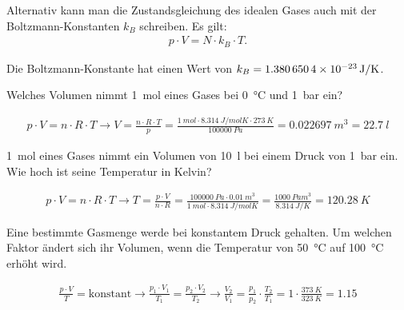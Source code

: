 Alternativ kann man die Zustandsgleichung des idealen Gases auch mit der Boltzmann-Konstanten $k_B$ schreiben.
Es gilt:
\begin{eqnarray*}
	p\cdot V = N\cdot k_B\cdot T\text{.}
\end{eqnarray*}

Die Boltzmann-Konstante hat einen Wert von $k_B=\SI{1.3806504E-23}{J/K}$.

\begin{aufgabe}
	Welches Volumen nimmt \SI{1}{mol} eines Gases bei \SI{0}{\celsius} und \SI{1}{bar} ein?
	\begin{loesung}
		\begin{eqnarray*}
			p\cdot V=n\cdot R\cdot T \to V=\frac{n\cdot R\cdot T}{p}=\frac{\SI{1}{mol}\cdot\SI{8.314}{J/mol K}\cdot\SI{273}{K}}{\SI{100000}{Pa}}=\SI{0.022697}{m^3}=\SI{22.7}{l}
		\end{eqnarray*}
	\end{loesung}
\end{aufgabe}

\begin{aufgabe}
	\SI{1}{mol} eines Gases nimmt ein Volumen von \SI{10}{l} bei einem Druck von \SI{1}{bar} ein.
	Wie hoch ist seine Temperatur in Kelvin?
	\begin{loesung}
		\begin{eqnarray*}
			p\cdot V=n\cdot R\cdot T \to T=\frac{p\cdot V}{n\cdot R}=\frac{\SI{100000}{Pa}\cdot\SI{0.01}{m^3}}{\SI{1}{mol}\cdot\SI{8.314}{J/mol K}}=\frac{\SI{1000}{Pa m^3}}{\SI{8.314}{J/ K}}=\SI{120.28}{K}
		\end{eqnarray*}
	\end{loesung}
\end{aufgabe}

\begin{aufgabe}
	Eine bestimmte Gasmenge werde bei konstantem Druck gehalten. Um welchen Faktor ändert sich
	ihr Volumen, wenn die Temperatur von \SI{50}{\celsius} auf \SI{100}{\celsius} erhöht wird.
	\begin{loesung}
		\begin{eqnarray*}
			\frac{p\cdot V}{T}=\text{konstant}\to\frac{p_1\cdot V_1}{T_1}=\frac{p_2\cdot V_2}{T_2}\to\frac{V_2}{V_1}=\frac{p_1}{p_2}\cdot\frac{T_2}{T_1}=1\cdot\frac{\SI{373}{K}}{\SI{323}{K}}=\num{1.15}
		\end{eqnarray*}
	\end{loesung}

\end{aufgabe}

